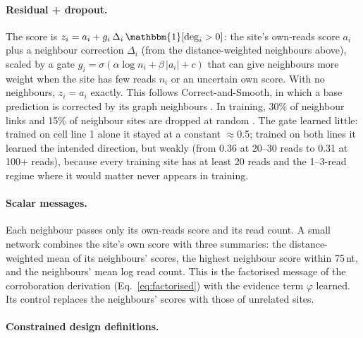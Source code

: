 \documentclass[11pt,a4paper]{article}
\begin{document}
\paragraph{Residual + dropout.} The score is
$z_i=a_i+g_i\,\Delta_i\,\mathbbm{1}[\deg_i>0]$: the site's own-reads score
$a_i$ plus a neighbour correction $\Delta_i$ (from the distance-weighted
neighbours above), scaled by a gate
$g_i=\sigma(\alpha\log n_i+\beta\,|a_i|+c)$ that can give neighbours more
weight when the site has few reads $n_i$ or an uncertain own score. With no
neighbours, $z_i=a_i$ exactly. This follows Correct-and-Smooth, in which a
base prediction is corrected by its graph neighbours \citep{huang2021}. In
training, 30\% of neighbour links and 15\% of neighbour sites are dropped at
random \citep{rong2020,feng2020}. The gate learned little: trained on cell
line 1 alone it stayed at a constant $\approx$0.5; trained on both lines it
learned the intended direction, but weakly (from 0.36 at 20--30 reads to 0.31
at 100+ reads), because every training site has at least 20 reads and the
1--3-read regime where it would matter never appears in training.

\paragraph{Scalar messages.} Each neighbour passes only its own-reads score
and its read count. A small network combines the site's own score with three
summaries: the distance-weighted mean of its neighbours' scores, the highest
neighbour score within 75\,nt, and the neighbours' mean log read count. This
is the factorised message of the corroboration derivation (Eq.~\eqref{eq:factorised})
with the evidence term $\varphi$ learned. Its control replaces the
neighbours' scores with those of unrelated sites.

\paragraph{Constrained design definitions.}
\end{document}
